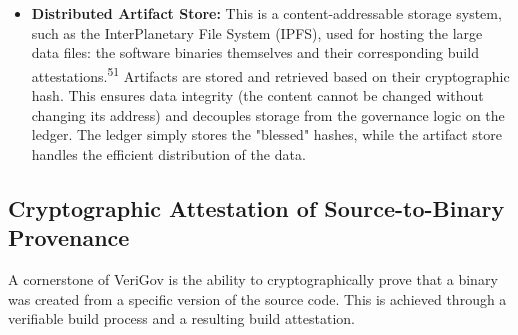 \documentclass{article}
\begin{document}
\begin{itemize}
\item \textbf{Distributed Artifact Store:} This is a content-addressable storage system, such as the InterPlanetary File System (IPFS), used for hosting the large data files: the software binaries themselves and their corresponding build attestations.\textsuperscript{51} Artifacts are stored and retrieved based on their cryptographic hash. This ensures data integrity (the content cannot be changed without changing its address) and decouples storage from the governance logic on the ledger. The ledger simply stores the "blessed" hashes, while the artifact store handles the efficient distribution of the data.
\end{itemize}

\subsection{Cryptographic Attestation of Source-to-Binary Provenance}

A cornerstone of VeriGov is the ability to cryptographically prove that a binary was created from a specific version of the source code. This is achieved through a verifiable build process and a resulting build attestation.
\end{document}
